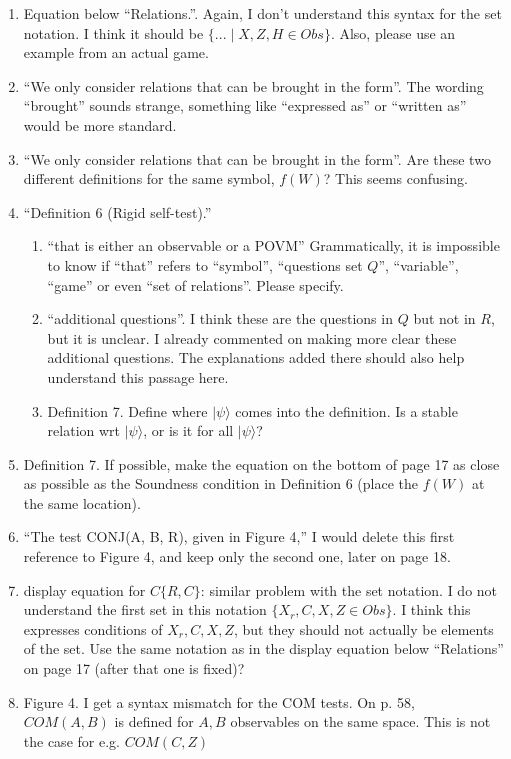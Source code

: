 \documentclass[12pt]{article}
\begin{document}
\begin{enumerate}
 \item Equation below ``Relations.''. Again, I don't understand this syntax for the set notation. I think it should be $\{... \mid X, Z, H \in Obs\}$. Also, please use an example from an actual game.
 \item ``We only consider relations that can be brought in the form''. The wording ``brought'' sounds strange, something like ``expressed as'' or ``written as'' would be more standard.
     \item ``We only consider relations that can be brought in the form''. Are these two different definitions for the same symbol, $f(W)$? This seems confusing.
\item  ``Definition 6 (Rigid self-test).''
\begin{enumerate}
\item ``that is either an observable or a POVM'' Grammatically, it is impossible to know if ``that'' refers to ``symbol'', ``questions set $Q$'', ``variable'', ``game'' or even ``set of relations''. Please specify.
\item ``additional questions''.   I think these are the questions in $Q$ but not in $R$, but it is unclear. I already commented on making more clear these additional questions. The explanations added there should also help understand this passage here.
    \item Definition 7. Define where $|\psi\rangle$ comes into the definition. Is a stable relation wrt $|\psi\rangle$, or is it for all $|\psi\rangle$?
\end{enumerate}
  \item Definition 7. If possible, make the equation on the bottom of page 17 as close as possible as the Soundness condition in Definition 6 (place the $f(W)$ at the same location).
      \item ``The test
CONJ(A, B, R), given in Figure 4,'' I would delete this first reference to Figure 4, and keep only the second one, later on page 18.
  \item display equation for $C\{R,C\}$: similar problem with the set notation. I do not understand the first set in this notation $\{X_r, C, X, Z \in Obs\}$. I think this expresses conditions of $X_r, C, X, Z$, but they should not actually be elements of the set. Use the same notation as in the display equation below ``Relations'' on page 17 (after that one is fixed)?
   \item Figure 4. I get a syntax mismatch for the COM tests. On p. 58, $COM(A,B)$ is defined for $A,B$ observables on the same space. This is not the case for e.g. $COM(C,Z)$

\end{enumerate}
\end{document}
